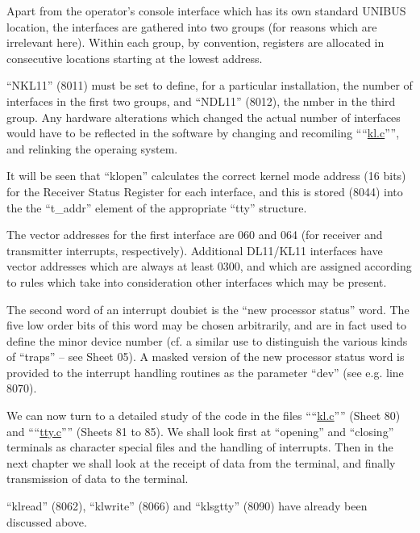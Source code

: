 Apart from the operator's console
interface which has its own standard
UNIBUS location, the interfaces are
gathered into two groups (for reasons
which are irrelevant here). Within
each group, by convention, registers
are allocated in consecutive locations
starting at the lowest address.


``NKL11'' (8011) must be set to define,
for a particular installation, the
number of interfaces in the first two
groups, and ``NDL11'' (8012), the nmber
in the third group. Any hardware
alterations which changed the actual
number of interfaces would have to be
reflected in the software by changing
and recomiling ````\href{./v6/dmr/kl.c}{kl.c}'''', and relinking
the operaing system.

It will be seen that ``klopen'' calculates the correct kernel mode address
(16 bits) for the Receiver Status
Register for each interface, and this
is stored (8044) into the the ``t\_addr''
element of the appropriate ``tty'' structure.


The vector addresses for the first
interface are 060 and 064 (for receiver
and transmitter interrupts, respectively).
Additional DL11/KL11 interfaces have vector addresses which are
always at least 0300, and which are
assigned according to rules which take
into consideration other interfaces
which may be present.

The second word of an interrupt doubiet
is the ``new processor status'' word. The
five low order bits of this word may be
chosen arbitrarily, and are in fact
used to define the minor device number
(cf. a similar use to distinguish the
various kinds of ``traps'' -- see Sheet
05). A masked version of the new processor status word is provided to the
interrupt handling routines as the
parameter ``dev'' (see e.g. line 8070).


We can now turn to a detailed study of
the code in the files ````\href{./v6/dmr/kl.c}{kl.c}'''' (Sheet 80)
and ````\href{./v6/dmr/tty.c}{tty.c}'''' (Sheets 81 to 85). We
shall look first at ``opening'' and
``closing'' terminals as character
special files and the handling of interrupts. Then in the next chapter we
shall look at the receipt of data from
the terminal, and finally transmission
of data to the terminal.

``klread'' (8062), ``klwrite'' (8066) and
``klsgtty'' (8090) have already been discussed above.

